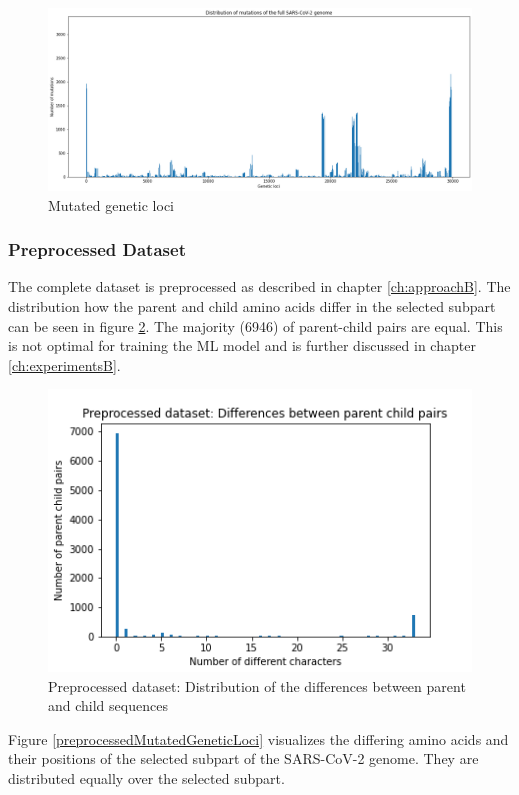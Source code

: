 \begin{figure}[ht!]
	\centering
	\includegraphics[width=1.0\linewidth]{figures/mutatedGeneticLoci.png}
	\caption{Mutated genetic loci \cite{own representation}}
	\label{mutatedGeneticLoci}
\end{figure}

\newpage
\subsubsection{Preprocessed Dataset} \label{experimentsAb}

The complete dataset is preprocessed as described in chapter \ref{ch:approachB}. The distribution how the parent and child amino acids differ in the selected subpart can be seen in figure \ref{preprocessedDistributionDifferencesParentChild}. The majority (6946) of parent-child pairs are equal. This is not optimal for training the \ac{ML} model and is further discussed in chapter \ref{ch:experimentsB}. 

\begin{figure}[ht]
	\centering
	\includegraphics[width=0.6\linewidth]{figures/preprocessedDistributionDifferencesParentChild.png}
	\caption{Preprocessed dataset: Distribution of the differences between parent and child sequences \cite{own representation}}
	\label{preprocessedDistributionDifferencesParentChild}
\end{figure}

Figure \ref{preprocessedMutatedGeneticLoci} visualizes the differing amino acids and their positions of the selected subpart of the \ac{SARS-CoV-2} genome. They are distributed equally over the selected subpart.

